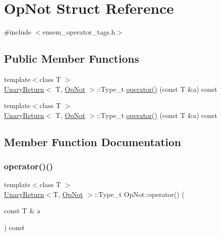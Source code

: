 \hypertarget{structOpNot}{}\section{Op\+Not Struct Reference}
\label{structOpNot}


{\ttfamily \#include $<$ensem\+\_\+operator\+\_\+tags.\+h$>$}

\subsection*{Public Member Functions}
\begin{DoxyCompactItemize}
\item 
{\footnotesize template$<$class T $>$ }\\\mbox{\hyperlink{structUnaryReturn}{Unary\+Return}}$<$ T, \mbox{\hyperlink{structOpNot}{Op\+Not}} $>$\+::Type\+\_\+t \mbox{\hyperlink{structOpNot_ac76618313170c606b7fb1ca1c2b0f164}{operator()}} (const T \&a) const
\item 
{\footnotesize template$<$class T $>$ }\\\mbox{\hyperlink{structUnaryReturn}{Unary\+Return}}$<$ T, \mbox{\hyperlink{structOpNot}{Op\+Not}} $>$\+::Type\+\_\+t \mbox{\hyperlink{structOpNot_ac76618313170c606b7fb1ca1c2b0f164}{operator()}} (const T \&a) const
\end{DoxyCompactItemize}


\subsection{Member Function Documentation}
\mbox{\label{structOpNot_ac76618313170c606b7fb1ca1c2b0f164}} 
\subsubsection{\texorpdfstring{operator()()}{operator()()}\hspace{0.1cm}{\footnotesize\ttfamily [1/2]}}
{\footnotesize\ttfamily template$<$class T $>$ \\
\mbox{\hyperlink{structUnaryReturn}{Unary\+Return}}$<$T, \mbox{\hyperlink{structOpNot}{Op\+Not}} $>$\+::Type\+\_\+t Op\+Not\+::operator() (\begin{DoxyParamCaption}\item[{const T \&}]{a }\end{DoxyParamCaption}) const\hspace{0.3cm}{\ttfamily [inline]}}


